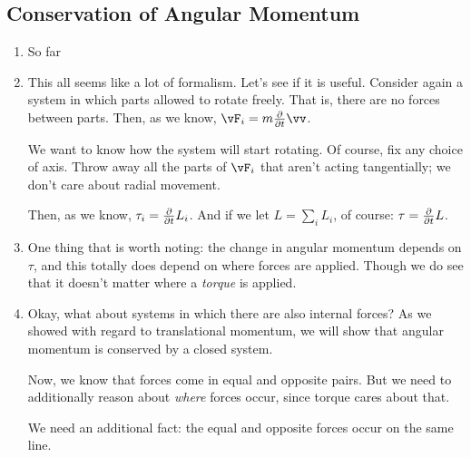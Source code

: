 \subsection{Conservation of Angular Momentum}

\begin{enumerate}
  \item So far

  \item This all seems like a lot of formalism. Let's see if it is
  useful. Consider again a system in which parts allowed to rotate
  freely. That is, there are no forces between parts. Then, as we know,
  $\vF_i = m \fpartial{t} \vv$.

  We want to know how the system will start rotating. Of course, fix any
  choice of axis. Throw away all the parts of $\vF_i$ that aren't acting
  tangentially; we don't care about radial movement.

  Then, as we know, $\tau_i = \frac{\partial }{\partial t} L_i$. And if we let $L =
  \sum_i L_i$, of course: $\tau = \frac{\partial }{\partial t} L$.

  \item One thing that is worth noting: the change in angular momentum
  depends on $\tau$, and this totally does depend on where forces are
  applied. Though we do see that it doesn't matter where a \emph{torque}
  is applied.

  \item Okay, what about systems in which there are also internal
  forces? As we showed with regard to translational momentum, we will
  show that angular momentum is conserved by a closed system.

  Now, we know that forces come in equal and opposite pairs. But we need
  to additionally reason about \emph{where} forces occur, since torque
  cares about that.

  We need an additional fact: the equal and opposite forces occur on the
  same line.
\end{enumerate}
